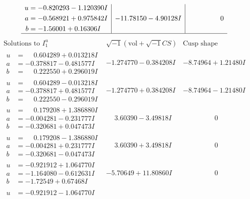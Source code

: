 \documentclass[1p]{elsarticle_modified}
\theoremstyle{definition}
\newcommand{\I}{\sqrt{-1}}
\begin{document}
$$\begin{array}{c|c|c}
\begin{aligned}
u &= -0.820293 - 1.120390 I \\
a &= -0.568921 + 0.975842 I \\
b &= -1.56001 + 0.16306 I\end{aligned}
 & -11.78150 - 4.90128 I & \phantom{-0.000000 } 0\\
 \hline 
 \end{array}$$\newpage$$\begin{array}{c|c|c}  
\text{Solutions to }I^u_{1}& \I (\text{vol} + \sqrt{-1}CS) & \text{Cusp shape}\\
 \hline 
\begin{aligned}
u &= \phantom{-}0.604289 + 0.013218 I \\
a &= -0.378817 - 0.481577 I \\
b &= \phantom{-}0.222550 + 0.296019 I\end{aligned}
 & -1.274770 - 0.384208 I & -8.74964 + 1.21480 I \\ \hline\begin{aligned}
u &= \phantom{-}0.604289 - 0.013218 I \\
a &= -0.378817 + 0.481577 I \\
b &= \phantom{-}0.222550 - 0.296019 I\end{aligned}
 & -1.274770 + 0.384208 I & -8.74964 - 1.21480 I \\ \hline\begin{aligned}
u &= \phantom{-}0.179208 + 1.386880 I \\
a &= -0.004281 - 0.231777 I \\
b &= -0.320681 + 0.047473 I\end{aligned}
 & \phantom{-}3.60390 - 3.49818 I & \phantom{-0.000000 } 0 \\ \hline\begin{aligned}
u &= \phantom{-}0.179208 - 1.386880 I \\
a &= -0.004281 + 0.231777 I \\
b &= -0.320681 - 0.047473 I\end{aligned}
 & \phantom{-}3.60390 + 3.49818 I & \phantom{-0.000000 } 0 \\ \hline\begin{aligned}
u &= -0.921912 + 1.064770 I \\
a &= -1.164080 - 0.612631 I \\
b &= -1.72549 + 0.67468 I\end{aligned}
 & -5.70649 + 11.80860 I & \phantom{-0.000000 } 0 \\ \hline\begin{aligned}
u &= -0.921912 - 1.064770 I \\

\end{aligned}
\end{array}$$
\end{document}

